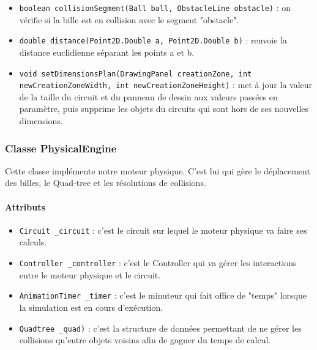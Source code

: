 \documentclass{report}
\begin{document}
\begin{itemize}
\item \texttt{boolean collisionSegment(Ball ball, ObstacleLine obstacle)} : on vérifie si la bille est en collision avec le segment "obstacle". 
\item \texttt{double distance(Point2D.Double a, Point2D.Double b)} : renvoie la distance euclidienne séparant les points a et b.
\item \texttt{void setDimensionsPlan(DrawingPanel creationZone, int newCreationZoneWidth, int newCreationZoneHeight)} : met à jour la valeur de la taille du circuit et du panneau de dessin  aux valeurs passées en paramètre, puis supprime les objets du circuits qui sont hors de ses nouvelles dimensions.
\end{itemize}

\subsubsection{Classe PhysicalEngine}

Cette classe implémente notre moteur physique. C'est lui qui gère le déplacement des billes, le Quad-tree et les résolutions de collisions.

\paragraph*{Attributs}
\begin{itemize}
\item \texttt{Circuit \_circuit} : c'est le circuit sur lequel le moteur physique va faire ses calculs.
\item \texttt{Controller \_controller} : c'est le Controller qui va gérer les interactions entre le moteur physique et le circuit.
\item \texttt{AnimationTimer \_timer} : c'est le minuteur qui fait office de "temps" lorsque la simulation est en cours d'exécution.
\item \texttt{Quadtree \_quad)} : c'est la structure de données permettant de ne gérer les collisions qu'entre objets voisins afin de gagner du temps de calcul.
\end{itemize}
\end{document}
